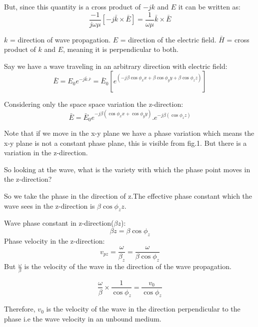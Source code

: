 But, since this quantity is a cross product of $-jk$ and $E$ it can be written as:
\begin{equation}
\frac{-1}{j\omega\mu} [-j\bar{k}\times\bar{E}] = \frac{1}{\omega\mu} \bar{k}\times\bar{E}
\end{equation}

$k$ = direction of wave propagation.
$E$ = direction of the electric field.
$\bar{H}$ = cross product of $k$ and $E$, meaning it is perpendicular to both.

Say we have a wave traveling in an arbitrary direction with electric field:
\begin{equation}
\bar{E} = E_0 e^{-j\bar{k}.\bar{r}} = \bar{E}_0[e^{(-j\beta\cos\phi_{x}x + \beta\cos\phi_{y}y + \beta\cos\phi_{z}z)}]
\end{equation}

Considering only the space space variation the z-direction:
\begin{equation}
\bar{E} = \bar{E}_0 e^{-j\beta(\cos\phi_{x}x + \cos\phi_{y}y)}.e^{-j\beta(\cos\phi_{z}z)}
\end{equation}

Note that if we move in the x-y plane we have a phase variation which means the x-y plane is not a constant phase plane, this is visible from fig.1. But there is a variation in the z-direction.

So looking at the wave, what is the variety with which the phase point moves in the z-direction?

So we take the phase in the direction of z.The effective phase constant which the wave sees in the z-direction is $\beta\cos\phi_{z}z$.

Wave phase constant in z-direction($\beta z$):
\begin{equation}
\beta z = \beta\cos\phi_{z}
\end{equation}
Phase velocity in the z-direction:
\begin{equation}
v_{pz} = \frac{\omega}{\beta_z} = \frac{\omega}{\beta\cos\phi_{z}}
\end{equation}
But $\frac{\omega}{\beta}$ is the velocity of the wave in the direction of the wave propagation.

\begin{equation}
\frac{\omega}{\beta}\times \frac{1}{\cos\phi_{z}} = \frac{v_0}{\cos\phi_{z}}
\end{equation}

Therefore, $v_0$ is the velocity of the wave in the direction perpendicular to the phase i.e the wave velocity in an unbound medium.


